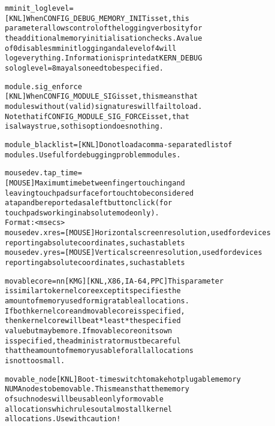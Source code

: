 \documentclass[a4paper,8pt,english]{sphinxmanual}
\begin{document}
\begin{alltt}
        mminit\_loglevel=
                        {[}KNL{]} When CONFIG\_DEBUG\_MEMORY\_INIT is set, this
                        parameter allows control of the logging verbosity for
                        the additional memory initialisation checks. A value
                        of 0 disables mminit logging and a level of 4 will
                        log everything. Information is printed at KERN\_DEBUG
                        so loglevel=8 may also need to be specified.

        module.sig\_enforce
                        {[}KNL{]} When CONFIG\_MODULE\_SIG is set, this means that
                        modules without (valid) signatures will fail to load.
                        Note that if CONFIG\_MODULE\_SIG\_FORCE is set, that
                        is always true, so this option does nothing.

        module\_blacklist=  {[}KNL{]} Do not load a comma-separated list of
                        modules.  Useful for debugging problem modules.

        mousedev.tap\_time=
                        {[}MOUSE{]} Maximum time between finger touching and
                        leaving touchpad surface for touch to be considered
                        a tap and be reported as a left button click (for
                        touchpads working in absolute mode only).
                        Format: \textless{}msecs\textgreater{}
        mousedev.xres=  {[}MOUSE{]} Horizontal screen resolution, used for devices
                        reporting absolute coordinates, such as tablets
        mousedev.yres=  {[}MOUSE{]} Vertical screen resolution, used for devices
                        reporting absolute coordinates, such as tablets

        movablecore=nn{[}KMG{]}     {[}KNL,X86,IA-64,PPC{]} This parameter
                        is similar to kernelcore except it specifies the
                        amount of memory used for migratable allocations.
                        If both kernelcore and movablecore is specified,
                        then kernelcore will be at *least* the specified
                        value but may be more. If movablecore on its own
                        is specified, the administrator must be careful
                        that the amount of memory usable for all allocations
                        is not too small.

        movable\_node    {[}KNL{]} Boot-time switch to make hotplugable memory
                        NUMA nodes to be movable. This means that the memory
                        of such nodes will be usable only for movable
                        allocations which rules out almost all kernel
                        allocations. Use with caution!


\end{alltt}
\end{document}

